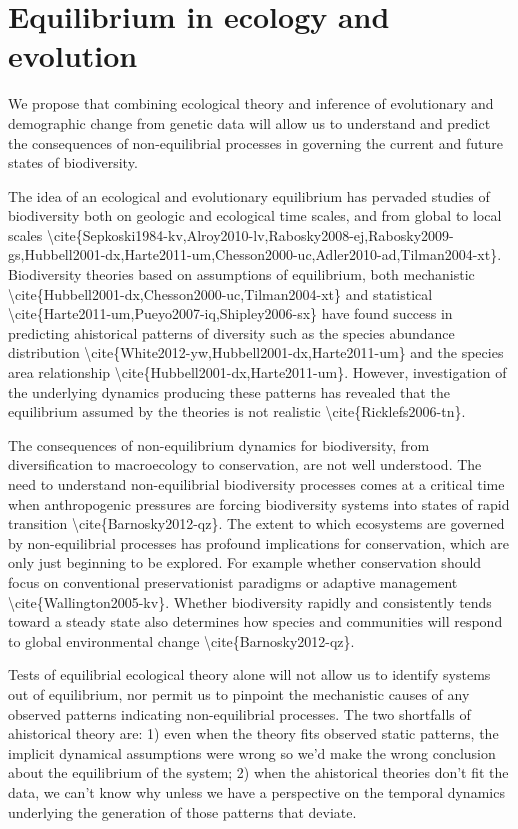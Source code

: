 \documentclass[]{article}
\date{}
\begin{document}
\section{Equilibrium in ecology and
evolution}\label{equilibrium-in-ecology-and-evolution}

We propose that combining ecological theory and inference of
evolutionary and demographic change from genetic data will allow us to
understand and predict the consequences of non-equilibrial processes in
governing the current and future states of biodiversity.

The idea of an ecological and evolutionary equilibrium has pervaded
studies of biodiversity both on geologic and ecological time scales, and
from global to local scales
\textbackslash{}cite\{Sepkoski1984-kv,Alroy2010-lv,Rabosky2008-ej,Rabosky2009-gs,Hubbell2001-dx,Harte2011-um,Chesson2000-uc,Adler2010-ad,Tilman2004-xt\}.
Biodiversity theories based on assumptions of equilibrium, both
mechanistic
\textbackslash{}cite\{Hubbell2001-dx,Chesson2000-uc,Tilman2004-xt\} and
statistical
\textbackslash{}cite\{Harte2011-um,Pueyo2007-iq,Shipley2006-sx\} have
found success in predicting ahistorical patterns of diversity such as
the species abundance distribution
\textbackslash{}cite\{White2012-yw,Hubbell2001-dx,Harte2011-um\} and the
species area relationship
\textbackslash{}cite\{Hubbell2001-dx,Harte2011-um\}. However,
investigation of the underlying dynamics producing these patterns has
revealed that the equilibrium assumed by the theories is not realistic
\textbackslash{}cite\{Ricklefs2006-tn\}.

The consequences of non-equilibrium dynamics for biodiversity, from
diversification to macroecology to conservation, are not well
understood. The need to understand non-equilibrial biodiversity
processes comes at a critical time when anthropogenic pressures are
forcing biodiversity systems into states of rapid transition
\textbackslash{}cite\{Barnosky2012-qz\}. The extent to which ecosystems
are governed by non-equilibrial processes has profound implications for
conservation, which are only just beginning to be explored. For example
whether conservation should focus on conventional preservationist
paradigms or adaptive management
\textbackslash{}cite\{Wallington2005-kv\}. Whether biodiversity rapidly
and consistently tends toward a steady state also determines how species
and communities will respond to global environmental change
\textbackslash{}cite\{Barnosky2012-qz\}.

Tests of equilibrial ecological theory alone will not allow us to
identify systems out of equilibrium, nor permit us to pinpoint the
mechanistic causes of any observed patterns indicating non-equilibrial
processes. The two shortfalls of ahistorical theory are: 1) even when
the theory fits observed static patterns, the implicit dynamical
assumptions were wrong so we'd make the wrong conclusion about the
equilibrium of the system; 2) when the ahistorical theories don't fit
the data, we can't know why unless we have a perspective on the temporal
dynamics underlying the generation of those patterns that deviate.
\end{document}
